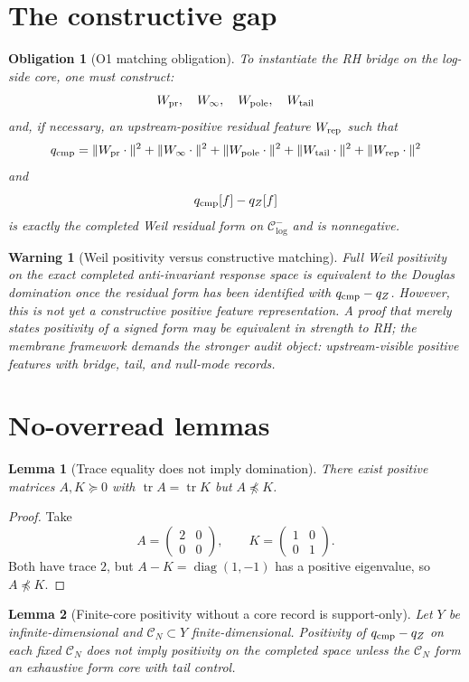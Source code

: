 \documentclass[11pt]{article}
\newtheorem{lemma}{Lemma}
\newtheorem{warning}{Warning}
\newtheorem{obligation}{Obligation}
\newcommand{\Ccore}{\mathcal C^-_{\log}}
\newcommand{\qcmp}{q_{\rm cmp}}
\newcommand{\qZ}{q_Z}
\begin{document}
\section{The constructive gap}
\begin{obligation}[O1 matching obligation]
To instantiate the RH bridge on the log-side core, one must construct:
\[
  W_{\rm pr},\quad W_\infty,
  \quad W_{\rm pole},\quad W_{\rm tail}
\]
and, if necessary, an upstream-positive residual feature $W_{\rm rep}$ such that
\[
  \qcmp=\|W_{\rm pr}\cdot\|^2+\|W_\infty\cdot\|^2+\|W_{\rm pole}\cdot\|^2+\|W_{\rm tail}\cdot\|^2+\|W_{\rm rep}\cdot\|^2
\]
and
\[
  \qcmp[f]-\qZ[f]
\]
is exactly the completed Weil residual form on $\Ccore$ and is nonnegative.
\end{obligation}

\begin{warning}[Weil positivity versus constructive matching]
Full Weil positivity on the exact completed anti-invariant response space is equivalent to the Douglas domination once the residual form has been identified with $\qcmp-\qZ$. However, this is not yet a constructive positive feature representation. A proof that merely states positivity of a signed form may be equivalent in strength to RH; the membrane framework demands the stronger audit object: upstream-visible positive features with bridge, tail, and null-mode records.
\end{warning}

\section{No-overread lemmas}
\begin{lemma}[Trace equality does not imply domination]
There exist positive matrices $A,K\succeq0$ with $\operatorname{tr}A=\operatorname{tr}K$ but $A\npreceq K$.
\end{lemma}
\begin{proof}
Take
\[
  A=\begin{pmatrix}2&0\\0&0\end{pmatrix},
  \qquad
  K=\begin{pmatrix}1&0\\0&1\end{pmatrix}.
\]
Both have trace $2$, but $A-K=\operatorname{diag}(1,-1)$ has a positive eigenvalue, so $A\npreceq K$.
\end{proof}

\begin{lemma}[Finite-core positivity without a core record is support-only]
Let $Y$ be infinite-dimensional and $\mathcal C_N\subset Y$ finite-dimensional. Positivity of $\qcmp-\qZ$ on each fixed $\mathcal C_N$ does not imply positivity on the completed space unless the $\mathcal C_N$ form an exhaustive form core with tail control.
\end{lemma}
\end{document}
